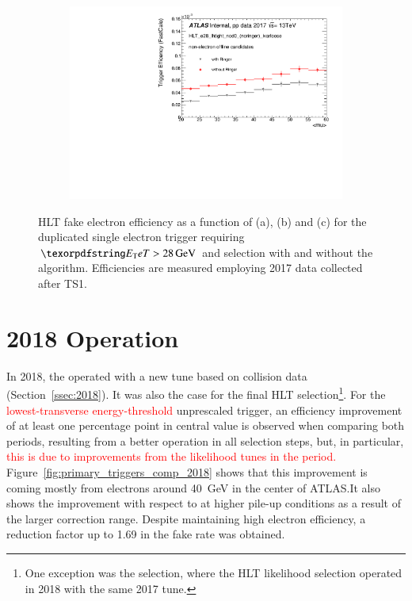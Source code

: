 \begin{figure}[h!tb]
\begin{center}
\begin{subfigure}[c]{.48\textwidth}
\centering
\includegraphics[width=\textwidth]{sections/operation/figures/efficiencies/eff_EGAM7_e28_ringer_and_noringer_2017_after_ts1_mu.pdf}
\caption{}
\end{subfigure}
\caption{HLT fake electron efficiency as a function of \et (a), \eta (b) and
\avgmu (c) for the duplicated single electron trigger requiring $\et >
\SI{28}{\GeV}$ and \tight selection with and without the \rnn{} algorithm.
Efficiencies are measured employing 2017 data collected after TS1.}%
\label{fig:e28_triggers_fake_hlt}
\end{center}
\end{figure}

\FloatBarrier

\section{2018 Operation}\label{ssec:2018_ringer_operation}

In 2018, the \rnn{} operated with a new tune based on collision data
(Section~\ref{ssec:2018}). It was also the case for the final HLT
selection\footnote{One exception was the \medium{} selection, where the HLT
likelihood selection operated in 2018 with the same 2017 tune.}. For the
\textcolor{red}{lowest-transverse energy-threshold}
unprescaled trigger, an efficiency
improvement of at least one percentage point in central value is observed when
comparing both periods, resulting from a better operation in all selection
steps, but, in particular,
\textcolor{red}{this is due to improvements from the likelihood tunes in the period.}
Figure~\ref{fig:primary_triggers_comp_2018} shows that this improvement is
coming mostly from electrons around \SI{40}{\GeV} in the center of ATLAS.\@ It
also shows the improvement with respect to \avgmu at higher pile-up conditions
as a result of the larger correction range. Despite maintaining high electron efficiency, a reduction factor up to 1.69 in the \fastcalo{} fake rate was obtained.

